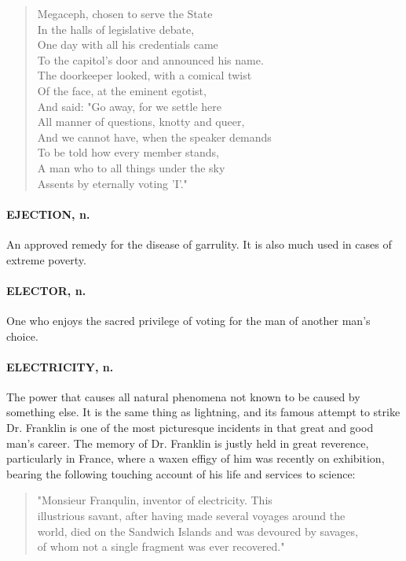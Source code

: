 \documentclass[11pt]{article}
\begin{document}
\begin{quote}   Megaceph, chosen to serve the State \\
  In the halls of legislative debate, \\
  One day with all his credentials came \\
  To the capitol's door and announced his name. \\
  The doorkeeper looked, with a comical twist \\
  Of the face, at the eminent egotist, \\
  And said:  "Go away, for we settle here \\
  All manner of questions, knotty and queer, \\
  And we cannot have, when the speaker demands \\
  To be told how every member stands, \\
  A man who to all things under the sky \\
  Assents by eternally voting 'I'."  \end{quote}

\paragraph{EJECTION, n.}  An approved remedy for the disease of garrulity.  It is
also much used in cases of extreme poverty.

\paragraph{ELECTOR, n.}  One who enjoys the sacred privilege of voting for the man
of another man's choice.

\paragraph{ELECTRICITY, n.}  The power that causes all natural phenomena not known
to be caused by something else.  It is the same thing as lightning,
and its famous attempt to strike Dr. Franklin is one of the most
picturesque incidents in that great and good man's career.  The memory
of Dr. Franklin is justly held in great reverence, particularly in
France, where a waxen effigy of him was recently on exhibition,
bearing the following touching account of his life and services to
science:

\begin{quote}       "Monsieur Franqulin, inventor of electricity.  This \\
  illustrious savant, after having made several voyages around the \\
  world, died on the Sandwich Islands and was devoured by savages, \\
  of whom not a single fragment was ever recovered."
\end{quote}
  
\end{document}
